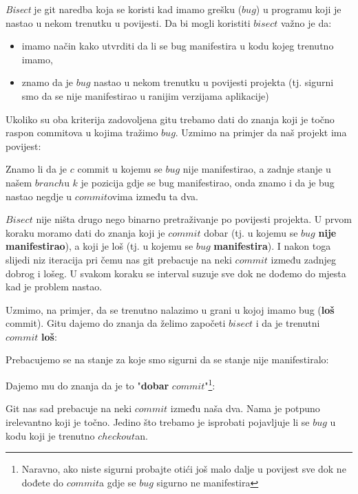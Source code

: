 
\emph{Bisect} je git naredba koja se koristi kad imamo grešku ($bug$) u programu koji je nastao u nekom trenutku u povijesti.
Da bi mogli koristiti $bisect$ važno je da:

\begin{itemize}
    \item imamo način kako utvrditi da li se bug manifestira u kodu kojeg trenutno imamo,
    \item znamo da je $bug$ nastao u nekom trenutku u povijesti projekta (tj. sigurni smo da se nije manifestirao u ranijim verzijama aplikacije)
\end{itemize}

Ukoliko su oba kriterija zadovoljena gitu trebamo dati do znanja koji je točno raspon commitova u kojima tražimo $bug$.
Uzmimo na primjer da naš projekt ima povijest:



Znamo li da je $c$ commit u kojemu se $bug$ nije manifestirao, a zadnje stanje u našem $branch$u $k$ je pozicija gdje se bug manifestirao, onda znamo i da je bug nastao negdje u $commit$ovima između ta dva.

$Bisect$ nije ništa drugo nego binarno pretraživanje po povijesti projekta. 
U prvom koraku moramo dati do znanja koji je $commit$ dobar (tj. u kojemu se $bug$ \textbf{nije manifestirao}), a koji je loš (tj. u kojemu se $bug$ \textbf{manifestira}).
I nakon toga slijedi niz iteracija pri čemu nas git prebacuje na neki $commit$ između zadnjeg dobrog i lošeg.
U svakom koraku se interval suzuje sve dok ne dođemo do mjesta kad je problem nastao.

Uzmimo, na primjer, da se trenutno nalazimo u grani u kojoj imamo bug (\textbf{loš} commit).
Gitu dajemo do znanja da želimo započeti $bisect$ i da je trenutni $commit$ \textbf{loš}:



Prebacujemo se na stanje za koje smo sigurni da se stanje nije manifestiralo:



Dajemo mu do znanja da je to "\textbf{dobar} $commit$"\footnote{Naravno, ako niste sigurni probajte otići još malo dalje u povijest sve dok ne dođete do $commit$a gdje se $bug$ sigurno ne manifestira}:



Git nas sad prebacuje na neki $commit$ između naša dva.
Nama je potpuno irelevantno koji je točno.
Jedino što trebamo je isprobati pojavljuje li se $bug$ u kodu koji je trenutno $checkout$an.

